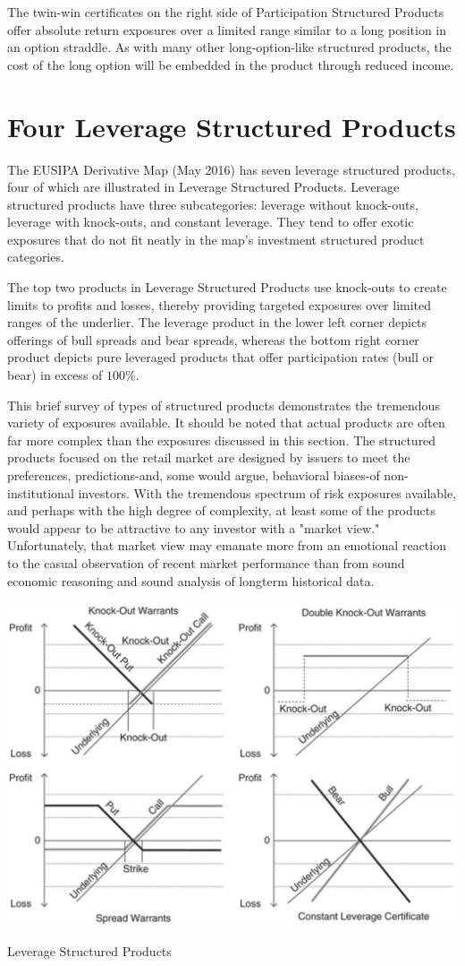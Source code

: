 \documentclass[11pt]{article}
\begin{document}
The twin-win certificates on the right side of Participation Structured Products offer absolute return exposures over a limited range similar to a long position in an option straddle. As with many other long-option-like structured products, the cost of the long option will be embedded in the product through reduced income.

\section*{Four Leverage Structured Products}
The EUSIPA Derivative Map (May 2016) has seven leverage structured products, four of which are illustrated in Leverage Structured Products. Leverage structured products have three subcategories: leverage without knock-outs, leverage with knock-outs, and constant leverage. They tend to offer exotic exposures that do not fit neatly in the map's investment structured product categories.

The top two products in Leverage Structured Products use knock-outs to create limits to profits and losses, thereby providing targeted exposures over limited ranges of the underlier. The leverage product in the lower left corner depicts offerings of bull spreads and bear spreads, whereas the bottom right corner product depicts pure leveraged products that offer participation rates (bull or bear) in excess of $100 \%$.

This brief survey of types of structured products demonstrates the tremendous variety of exposures available. It should be noted that actual products are often far more complex than the exposures discussed in this section. The structured products focused on the retail market are designed by issuers to meet the preferences, predictions-and, some would argue, behavioral biases-of non-institutional investors. With the tremendous spectrum of risk exposures available, and perhaps with the high degree of complexity, at least some of the products would appear to be attractive to any investor with a "market view." Unfortunately, that market view may emanate more from an emotional reaction to the casual observation of recent market performance than from sound economic reasoning and sound analysis of longterm historical data.

\begin{center}
\includegraphics[max width=\textwidth]{2024_04_10_b75ef470ae043c0f718dg-4}
\end{center}

Leverage Structured Products
\end{document}
